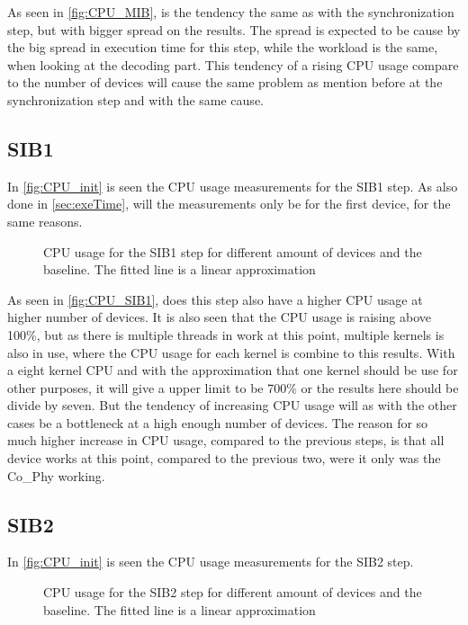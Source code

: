 As seen in \autoref{fig:CPU_MIB}, is the tendency the same as with the synchronization step, but with bigger spread on the results. The spread is expected to be cause by the big spread in execution time for this step, while the workload is the same, when looking at the decoding part. This tendency of a rising CPU usage compare to the number of devices will cause the same problem as mention before at the synchronization step and with the same cause.

\subsection{SIB1}
In \autoref{fig:CPU_init} is seen the CPU usage measurements for the SIB1 step. As also done in \autoref{sec:exeTime}, will the measurements only be for the first device, for the same reasons.

\begin{figure}[H]
\centering
\resizebox{0.5\textwidth}{!}{
}
\caption{CPU usage for the SIB1 step for different amount of devices and the baseline. The fitted line is a linear approximation}
\label{fig:CPU_SIB1}
\end{figure}

As seen in \autoref{fig:CPU_SIB1}, does this step also have a higher CPU usage at higher number of devices. It is also seen that the CPU usage is raising above 100\%, but as there is multiple threads in work at this point, multiple kernels is also in use, where the CPU usage for each kernel is combine to this results. With a eight kernel CPU and with the approximation that one kernel should be use for other purposes, it will give a upper limit to be 700\% or the results here should be divide by seven. But the tendency of increasing CPU usage will as with the other cases be a bottleneck at a high enough number of devices. The reason for so much higher increase in CPU usage, compared to the previous steps, is that all device works at this point, compared to the previous two, were it only was the Co\_Phy working.

\subsection{SIB2}
In \autoref{fig:CPU_init} is seen the CPU usage measurements for the SIB2 step.

\begin{figure}[H]
\centering
\resizebox{0.5\textwidth}{!}{
}
\caption{CPU usage for the SIB2 step for different amount of devices and the baseline. The fitted line is a linear approximation}
\label{fig:CPU_SIB2}
\end{figure}


